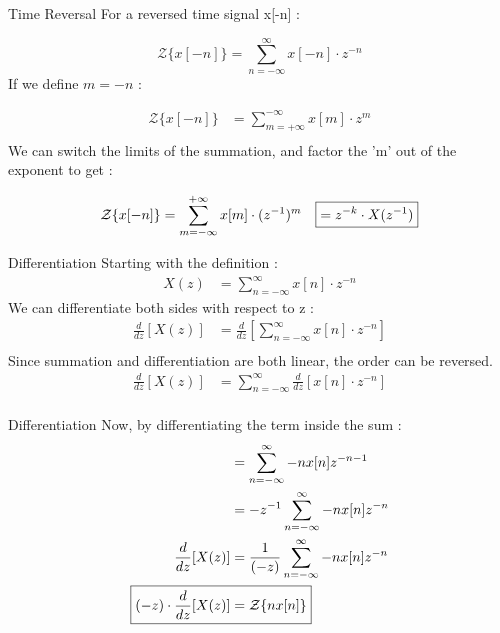\documentclass{beamer}
\begin{document}
\begin{frame}{Time Reversal}
For a reversed time signal x[-n] :

    \[ \mathcal{Z}\{ x[-n] \} = \sum_{n=-\infty}^{\infty}  x[-n] \cdot z^{-n} \]
    If we define $m = -n$ :
    
    \begin{align*}
        \mathcal{Z}\{ x[-n] \} &= \sum_{m=+\infty}^{-\infty}  x[m] \cdot z^{m} \\
    \end{align*}
     We can switch the limits of the summation, and factor the 'm' out of the exponent to get : 
    
    \begin{align*}
       \mathcal{Z}\{ x[-n] \} &= \sum_{m=-\infty}^{+\infty}  x[m] \cdot (z^{-1})^{m} \Aboxed{&= z^{-k} \cdot X(z^{-1})}
    \end{align*}{}
    
\end{frame}

\begin{frame}{Differentiation}
    Starting with the definition :
    \begin{align*}
        X(z) &= \sum_{n=-\infty}^{\infty} x[n] \cdot z^{-n}
    \end{align*}
    We can differentiate both sides with respect to z :
    \begin{align*}
        \frac{d}{dz}[X(z)] &= \frac{d}{dz}[\sum_{n=-\infty}^{\infty} x[n] \cdot z^{-n}] \\
    \end{align*}
    Since summation and differentiation are both linear, the order can be reversed.
    \begin{align*}
        \frac{d}{dz}[X(z)] &= \sum_{n=-\infty}^{\infty} \frac{d}{dz} [x[n] \cdot z^{-n}] \\
    \end{align*}{}
\end{frame}
\begin{frame}{Differentiation}
    Now, by differentiating the term inside the sum :
    \begin{align*}
        &= \sum_{n=-\infty}^{\infty} -nx[n]z^{-n-1} \\
        &= -z^{-1} \sum_{n=-\infty}^{\infty} -nx[n]z^{-n} \\
        \frac{d}{dz}[X(z)] &= \frac{1}{(-z)} \sum_{n=-\infty}^{\infty} -nx[n]z^{-n}\\
        \Aboxed{(-z) \cdot \frac{d}{dz}[X(z)] &= \mathcal{Z}\{ nx[n] \}}
    \end{align*}
        
\end{frame}
\end{document}
